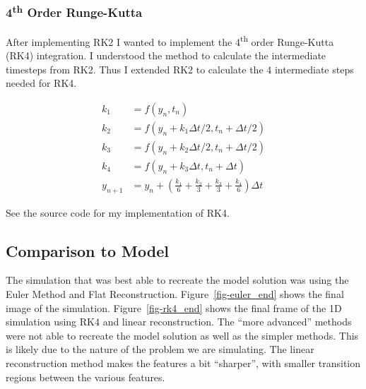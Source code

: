 \documentclass[
  letterpaper,
]{article}
\begin{document}
\subsubsection{\texorpdfstring{4\textsuperscript{th} Order
Runge-Kutta}{4th Order Runge-Kutta}}\label{th-order-runge-kutta}

After implementing RK2 I wanted to implement the 4\textsuperscript{th}
order Runge-Kutta (RK4) integration. I understood the method to
calculate the intermediate timesteps from RK2. Thus I extended RK2 to
calculate the 4 intermediate steps needed for RK4.

\begin{align*}
k_1 &= f(y_n, t_n) \\
k_2 &= f(y_n+k_1 \Delta t/2, t_n + \Delta t / 2) \\
k_3 &= f(y_n+k_2 \Delta t/2, t_n + \Delta t / 2) \\
k_4 &= f(y_n+k_3 \Delta t, t_n + \Delta t) \\
y_{n+1} &= y_n + \left(
\frac{k_1}{6} + 
\frac{k_2}{3} + 
\frac{k_3}{3} + 
\frac{k_4}{6}
\right)\Delta t
\end{align*}

See the source code for my implementation of RK4.

\subsection{Comparison to Model}\label{sec-model-compare}

The simulation that was best able to recreate the model solution was
using the Euler Method and Flat Reconstruction.
Figure~\ref{fig-euler_end} shows the final image of the simulation.
Figure~\ref{fig-rk4_end} shows the final frame of the 1D simulation
using RK4 and linear reconstruction. The ``more advanced'' methods were
not able to recreate the model solution as well as the simpler methods.
This is likely due to the nature of the problem we are simulating. The
linear reconstruction method makes the features a bit ``sharper'', with
smaller transition regions between the various features.
\end{document}
